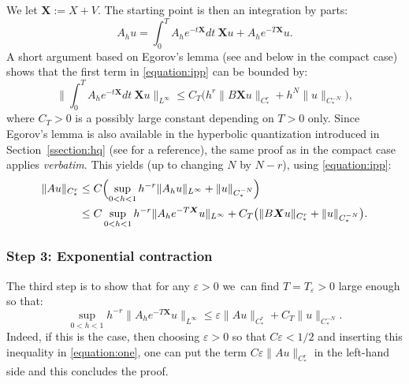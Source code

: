 \documentclass[10pt]{amsart}
\newcommand{\eps}{\varepsilon}
\newcommand{\X}{\boldsymbol{X}}
\theoremstyle{plain}
\theoremstyle{definition}
\begin{document}
We let $\X := X+V$. The starting point is then an integration by parts:
\begin{equation}
\label{equation:ipp}
A_h u = \int_0^T A_h e^{-t\X}dt ~\X u + A_h e^{-T\X}u.
\end{equation}
A short argument based on Egorov's lemma (see \cite[Eq.\,(3.4)]{Bonthonneau-Lefeuvre-21} and below in the compact case) shows that the first term in \eqref{equation:ipp} can be bounded by:
\[
\biggl\|\int_0^T A_h e^{-t\X}dt ~\X u\biggr\|_{L^\infty} \leq C_T \bigl(h^r \|B \X u \|_{C^r_*} + h^N \|u\|_{C^{-N}_*} \bigr),
\]
where $C_T > 0$ is a possibly large constant depending on $T > 0$ only. Since Egorov's lemma is also available in the hyperbolic quantization introduced in Section~\ref{ssection:hq} (see \cite[Th.\,2]{Bonthonneau-16} for a reference), the same proof as in the compact case applies \emph{verbatim}. This yields (up to changing $N$ by $N-r$), using \eqref{equation:ipp}:
\begin{equation}
\label{equation:one}
\begin{split}
\|Au \|_{C^r_*} & \leq C \Bigl(\sup_{0 < h < 1} h^{-r} \|A_h u\|_{L^\infty} + \|u\|_{C^{-N}_*} \Bigr) \\
& \leq C \sup_{0 < h < 1} h^{-r} \|A_h e^{-T\X} u\|_{L^\infty} + C_T \bigl( \|B \X u \|_{C^r_*} + \|u\|_{C^{-N}_*} \bigr).
\end{split}
\end{equation}

\subsubsection*{Step 3: Exponential contraction}
The third step is to show that for any $\eps > 0$ we~can find $T = T_\eps > 0$ large enough so that:
\begin{equation}
\label{equation:contraction}
\sup_{0 < h < 1} h^{-r} \|A_h e^{-T\X}u\|_{L^\infty} \leq \eps \|A u \|_{C^r_*} + C_T \|u\|_{C^{-N}_*}.
\end{equation}
Indeed, if this is the case, then choosing $\eps > 0$ so that $C \eps < 1/2$ and inserting this inequality in \eqref{equation:one}, one can put the term $ C \eps \|A u \|_{C^r_*}$ in the left-hand side and this concludes the proof.
\end{document}

